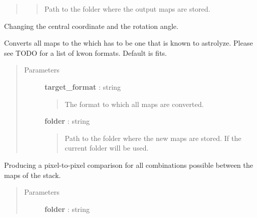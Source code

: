 \documentclass[a4paper,10pt,english]{sphinxmanual}
\begin{document}
\begin{fulllineitems}
\begin{fulllineitems}
\begin{quote}
\begin{description}
\begin{quote}
Path to the folder where the output maps are stored.
\end{quote}

\end{description}\end{quote}

\end{fulllineitems}


\begin{fulllineitems}
\label{maps:astrolyze.maps.stack.Stack.unify_projections}
Changing the central coordinate and the rotation angle.

\end{fulllineitems}


\begin{fulllineitems}
\label{maps:astrolyze.maps.stack.Stack.unify_formats}
Converts all maps to the  which has to be one
that is known to astrolyze. Please see TODO for a list of kwon formats.
Default is fits.
\begin{quote}\begin{description}
\item[{Parameters }] \leavevmode
\textbf{target\_format} : string
\begin{quote}

The format to which all maps are converted.
\end{quote}

\textbf{folder} : string
\begin{quote}

Path to the folder where the new maps are stored.
If  the current folder will be used.
\end{quote}

\end{description}\end{quote}

\end{fulllineitems}


\begin{fulllineitems}
\label{maps:astrolyze.maps.stack.Stack.pixel_pixel_compare}
Producing a pixel-to-pixel comparison for all combinations
possible between the maps of the stack.
\begin{quote}\begin{description}
\item[{Parameters }] \leavevmode
\textbf{folder} : string
\begin{quote}


\end{quote}
\end{description}
\end{quote}
\end{fulllineitems}
\end{fulllineitems}
\end{document}
